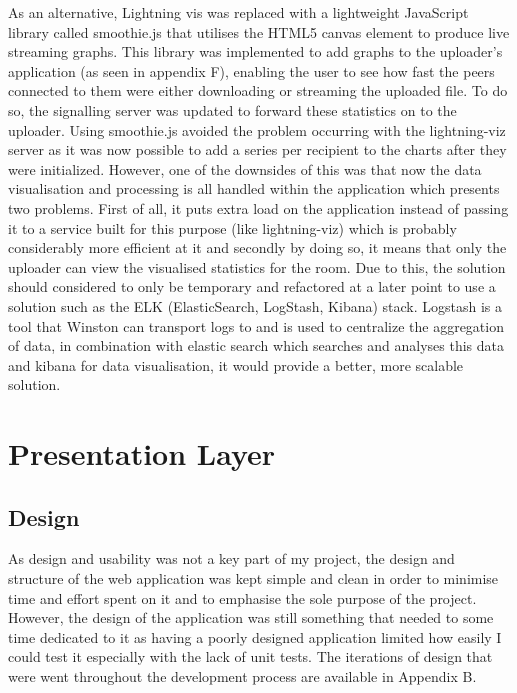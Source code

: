 \documentclass[]{report}
\begin{document}
				As an alternative, Lightning vis was replaced with a lightweight JavaScript library called smoothie.js that utilises the HTML5 canvas element to produce live streaming graphs. This library was implemented to add graphs to the uploader's application (as seen in appendix F), enabling the user to see how fast the peers connected to them were either downloading or streaming the uploaded file. To do so, the signalling server was updated to forward these statistics on to the uploader. Using smoothie.js avoided the problem occurring with the lightning-viz server as it was now possible to add a series per recipient to the charts after they were initialized. However, one of the downsides of this was that now the data visualisation and processing is all handled within the application which presents two problems. First of all, it puts extra load on the application instead of passing it to a service built for this purpose (like lightning-viz) which is probably considerably more efficient at it and secondly by doing so, it means that only the uploader can view the visualised statistics for the room. Due to this, the solution should considered to only be temporary and refactored at a later point to use a solution such as the ELK (ElasticSearch, LogStash, Kibana) stack. Logstash is a tool that Winston can transport logs to and is used to centralize the aggregation of data, in combination with elastic search which searches and analyses this data and kibana for data visualisation, it would provide a better, more scalable solution.
			
		\section{Presentation Layer}
			\subsection{Design}		
			As design and usability was not a key part of my project, the design and structure of the web application was kept simple and clean in order to minimise time and effort spent on it and to emphasise the sole purpose of the project. However, the design of the application was still something that needed to some time dedicated to it as having a poorly designed application limited how easily I could test it especially with the lack of unit tests. The iterations of design that were went throughout the development process are available in Appendix B.
\end{document}
